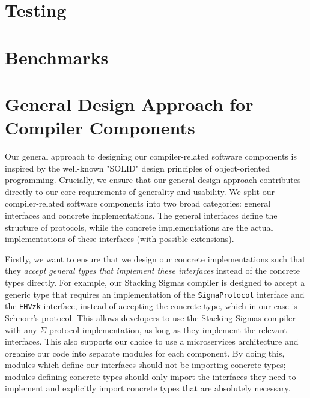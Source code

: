 \section{Testing}\label{design:testing}


\section{Benchmarks}\label{design:bench}
 

\section{General Design Approach for Compiler Components}\label{design:approach}
Our general approach to designing our compiler-related software components is inspired by the 
well-known "SOLID" design principles \cite{martin2000design} of object-oriented programming. 
Crucially, we ensure that our general design approach contributes directly to our core requirements 
of generality and usability. We split our compiler-related software components into two broad categories: 
general interfaces 
and concrete implementations. The general interfaces define the structure of protocols, while the 
concrete implementations are the actual implementations of these interfaces (with possible extensions).

Firstly, we want to ensure that we design our concrete implementations such that 
they \textit{accept general types that implement these interfaces} instead of the concrete 
types directly.
For example, our Stacking Sigmas compiler is designed to 
accept a generic type that requires an implementation of the \texttt{SigmaProtocol} interface and the 
\texttt{EHVzk} interface, instead of accepting the concrete type, which in our case is Schnorr's protocol. 
This allows developers to use the Stacking Sigmas compiler with any $\Sigma$-protocol implementation, as 
long as they implement the relevant interfaces. This also supports our choice to use a microservices architecture and organise our code into separate modules for each component. 
By doing this, modules which define our interfaces should not be importing concrete types; modules 
defining concrete types should only import the interfaces they need to implement and explicitly 
import concrete types that are absolutely necessary. 

